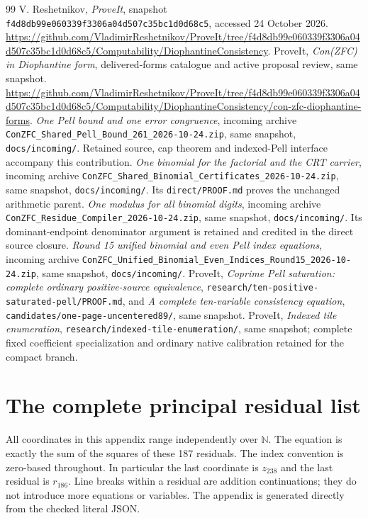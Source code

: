 \documentclass[11pt]{article}
\theoremstyle{definition}\newtheorem{definition}[theorem]{Definition}
\theoremstyle{remark}\newtheorem{remark}[theorem]{Remark}
\newcommand{\N}{\mathbb N}\newcommand{\Z}{\mathbb Z}\newcommand{\Q}{\mathbb Q}
\newcommand{\code}[1]{\nolinkurl{#1}}
\begin{document}
\begin{thebibliography}{99}
 V. Reshetnikov, \emph{ProveIt}, snapshot \code{f4d8db99e060339f3306a04d507c35bc1d0d68c5}, accessed 24 October 2026. \url{https://github.com/VladimirReshetnikov/ProveIt/tree/f4d8db99e060339f3306a04d507c35bc1d0d68c5/Computability/DiophantineConsistency}.
 ProveIt, \emph{Con(ZFC) in Diophantine form}, delivered-forms catalogue and active proposal review, same snapshot. \url{https://github.com/VladimirReshetnikov/ProveIt/tree/f4d8db99e060339f3306a04d507c35bc1d0d68c5/Computability/DiophantineConsistency/con-zfc-diophantine-forms}.
 \emph{One Pell bound and one error congruence}, incoming archive \code{ConZFC_Shared_Pell_Bound_261_2026-10-24.zip}, same snapshot, \code{docs/incoming/}. Retained source, cap theorem and indexed-Pell interface accompany this contribution.
 \emph{One binomial for the factorial and the CRT carrier}, incoming archive \code{ConZFC_Shared_Binomial_Certificates_2026-10-24.zip}, same snapshot, \code{docs/incoming/}. Its \code{direct/PROOF.md} proves the unchanged arithmetic parent.
 \emph{One modulus for all binomial digits}, incoming archive \code{ConZFC_Residue_Compiler_2026-10-24.zip}, same snapshot, \code{docs/incoming/}. Its dominant-endpoint denominator argument is retained and credited in the direct source closure.
 \emph{Round 15 unified binomial and even Pell index equations}, incoming archive \code{ConZFC_Unified_Binomial_Even_Indices_Round15_2026-10-24.zip}, same snapshot, \code{docs/incoming/}.
 ProveIt, \emph{Coprime Pell saturation: complete ordinary positive-source equivalence}, \code{research/ten-positive-saturated-pell/PROOF.md}, and \emph{A complete ten-variable consistency equation}, \code{candidates/one-page-uncentered89/}, same snapshot.
 ProveIt, \emph{Indexed tile enumeration}, \code{research/indexed-tile-enumeration/}, same snapshot; complete fixed coefficient specialization and ordinary native calibration retained for the compact branch.
\end{thebibliography}

\appendix
\section{The complete principal residual list}\label{app:residuals}

All coordinates in this appendix range independently over $\N$. The equation is exactly the sum of the squares of these 187 residuals. The index convention is zero-based throughout. In particular the last coordinate is $z_{238}$ and the last residual is $r_{186}$. Line breaks within a residual are addition continuations; they do not introduce more equations or variables. The appendix is generated directly from the checked literal JSON.
\end{document}
